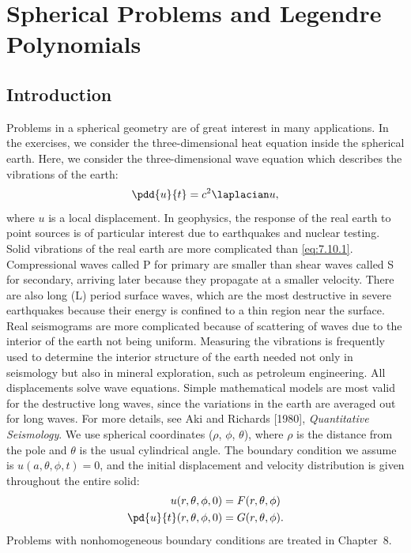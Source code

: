 \section{Spherical Problems and Legendre Polynomials}
\label{sec:7.10}

\subsection{Introduction}
\label{sec:7.10.1}

Problems in a spherical geometry are of great interest in many applications.  In the exercises, we consider the three-dimensional heat equation inside the spherical earth.  Here, we consider the three-dimensional wave equation which describes the vibrations of the earth:
\begin{equation}
\pdd{u}{t} = c^2\laplacian u,
\label{eq:7.10.1}
\end{equation}
where $u$ is a local displacement.  In geophysics, the response of the real earth to point sources is of particular interest due to earthquakes and nuclear testing.  Solid vibrations of the real earth are more complicated than \eqref{eq:7.10.1}.  Compressional waves called P for primary are smaller than shear waves called S for secondary, arriving later because they propagate at a smaller velocity.  There are also long (L) period surface waves, which are the most destructive in severe earthquakes because their energy is confined to a thin region near the surface.  Real seismograms are more complicated because of scattering of waves due to the interior of the earth not being uniform.  Measuring the vibrations is frequently used to determine the interior structure of the earth needed not only in seismology but also in mineral exploration, such as petroleum engineering.  All displacements solve wave equations.  Simple mathematical models are most valid for the destructive long waves, since the variations in the earth are averaged out for long waves.  For more details, see Aki and Richards [1980], \emph{Quantitative Seismology}.  We use spherical coordinates ($\rho$, $\phi$, $\theta$), where $\rho$ is the distance from the pole and $\theta$ is the usual cylindrical angle.  The boundary condition we assume is $u(a,\theta,\phi,t) = 0$, and the initial displacement and velocity distribution is given throughout the entire solid:
\begin{align}
u(r,\theta,\phi,0) &= F(r,\theta,\phi) \label{eq:7.10.2} \\
\pd{u}{t}(r,\theta,\phi,0) &= G(r,\theta,\phi). \label{eq:7.10.3}
\end{align}
Problems with nonhomogeneous boundary conditions are treated in Chapter~8.


